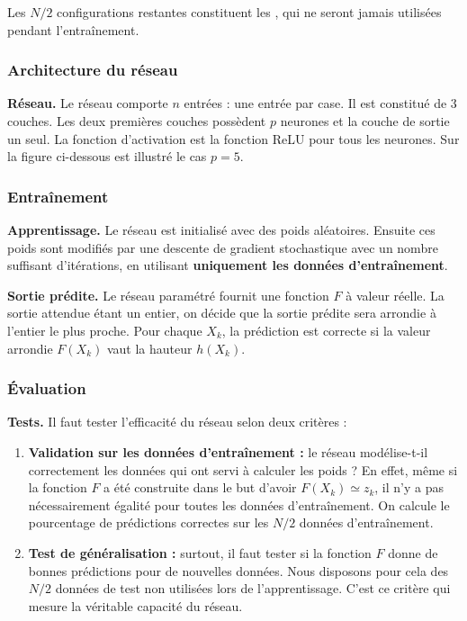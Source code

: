 Les $N/2$ configurations restantes constituent les , qui ne seront jamais utilisées pendant l'entraînement.

\subsubsection*{Architecture du réseau}

\textbf{Réseau.}
Le réseau comporte $n$ entrées : une entrée par case. Il est constitué de $3$ couches.
Les deux premières couches possèdent $p$ neurones et la couche de sortie un seul. La fonction d'activation est la fonction ReLU pour tous les neurones. Sur la figure ci-dessous est illustré le cas $p=5$.



\subsubsection*{Entraînement}

\textbf{Apprentissage.}
Le réseau est initialisé avec des poids aléatoires. Ensuite ces poids sont modifiés par une descente de gradient stochastique avec un nombre suffisant d'itérations, en utilisant \textbf{uniquement les données d'entraînement}.

\textbf{Sortie prédite.}
Le réseau paramétré fournit une fonction $F$ à valeur réelle. La sortie attendue étant un entier, on décide que la sortie prédite sera arrondie à l'entier le plus proche.
Pour chaque $X_k$, la prédiction est correcte si la valeur arrondie $F(X_k)$ vaut la hauteur $h(X_k)$. 


\subsubsection*{Évaluation}

\textbf{Tests.}
Il faut tester l'efficacité du réseau selon deux critères :

\begin{enumerate}
	\item \textbf{Validation sur les données d'entraînement :} le réseau modélise-t-il correctement les données qui ont servi à calculer les poids ? En effet, même si la fonction $F$ a été construite dans le but d'avoir $F(X_k) \simeq z_k$, il n'y a pas nécessairement égalité pour toutes les données d'entraînement. On calcule le pourcentage de prédictions correctes sur les $N/2$ données d'entraînement.
	
	\item \textbf{Test de généralisation :} surtout, il faut tester si la fonction $F$ donne de bonnes prédictions pour de nouvelles données. Nous disposons pour cela des $N/2$ données de test non utilisées lors de l'apprentissage. C'est ce critère qui mesure la véritable capacité du réseau.
\end{enumerate}

